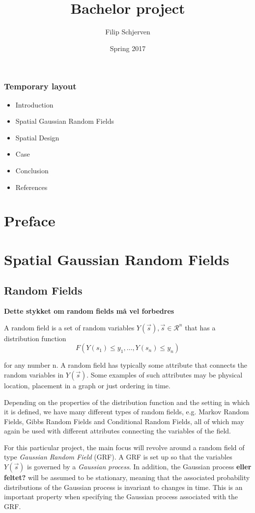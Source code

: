 \documentclass{report}
\title{Bachelor project}
\author{Filip Schjerven}
\date{Spring 2017}
\begin{document}
\maketitle
\tableofcontents
\subsection{Temporary layout}
\begin{itemize}
\item Introduction
\item Spatial Gaussian Random Fields
\item Spatial Design
\item Case
\item Conclusion
\item References
\end{itemize}
\chapter{Preface}
\chapter{Spatial Gaussian Random Fields}
\section{Random Fields}
\textbf{Dette stykket om random fields må vel forbedres}

A random field is a set of random variables $Y(\vec{s}), \vec{s} \in \mathcal{R}^n$ that has a distribution function 
\begin{equation} \label{eq:distribution_function}
F(Y(s_1) \leq y_1, \dots , Y(s_n) \leq y_n)
\end{equation} 

for any number n. A random field has typically some attribute that connects the random variables in $Y(\vec{s})$. Some examples of such attributes may be physical location, placement in a graph or just ordering in time.

Depending on the properties of the distribution function and the setting in which it is defined, we have many different types of random fields, e.g. Markov Random Fields, Gibbs Random Fields and Conditional Random Fields, all of which may again be used with different attributes connecting the variables of the field. 

For this particular project, the main focus will revolve around a random field of type \textit{Gaussian Random Field} (GRF). A GRF is set up so that the variables $Y(\vec{s})$ is governed by a \textit{Gaussian process}. In addition, the Gaussian process \textbf{eller feltet?} will be assumed to be stationary, meaning that the associated probability distributions of the Gaussian process is invariant to changes in time. This is an important property when specifying the Gaussian process associated with the GRF.
\end{document}
